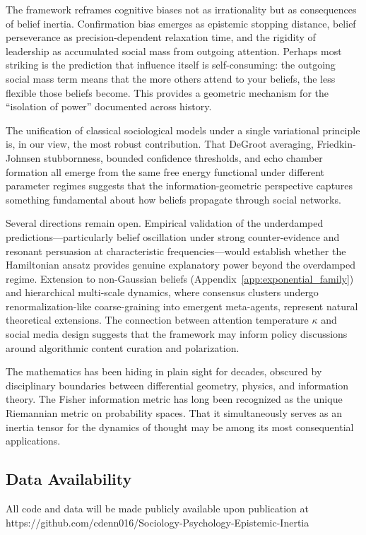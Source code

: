 \documentclass[12pt]{article}
\begin{document}
The framework reframes cognitive biases not as irrationality but as consequences of belief inertia. Confirmation bias emerges as epistemic stopping distance, belief perseverance as precision-dependent relaxation time, and the rigidity of leadership as accumulated social mass from outgoing attention. Perhaps most striking is the prediction that influence itself is self-consuming: the outgoing social mass term means that the more others attend to your beliefs, the less flexible those beliefs become. This provides a geometric mechanism for the ``isolation of power'' documented across history.

The unification of classical sociological models under a single variational principle is, in our view, the most robust contribution. That DeGroot averaging, Friedkin-Johnsen stubbornness, bounded confidence thresholds, and echo chamber formation all emerge from the same free energy functional under different parameter regimes suggests that the information-geometric perspective captures something fundamental about how beliefs propagate through social networks.

Several directions remain open. Empirical validation of the underdamped predictions---particularly belief oscillation under strong counter-evidence and resonant persuasion at characteristic frequencies---would establish whether the Hamiltonian ansatz provides genuine explanatory power beyond the overdamped regime. Extension to non-Gaussian beliefs (Appendix~\ref{app:exponential_family}) and hierarchical multi-scale dynamics, where consensus clusters undergo renormalization-like coarse-graining into emergent meta-agents, represent natural theoretical extensions. The connection between attention temperature $\kappa$ and social media design suggests that the framework may inform policy discussions around algorithmic content curation and polarization.

The mathematics has been hiding in plain sight for decades, obscured by disciplinary boundaries between differential geometry, physics, and information theory. The Fisher information metric has long been recognized as the unique Riemannian metric on probability spaces. That it simultaneously serves as an inertia tensor for the dynamics of thought may be among its most consequential applications.

\subsection*{Data Availability}
All code and data will be made publicly available upon publication at \\ 
https://github.com/cdenn016/Sociology-Psychology-Epistemic-Inertia
\end{document}
